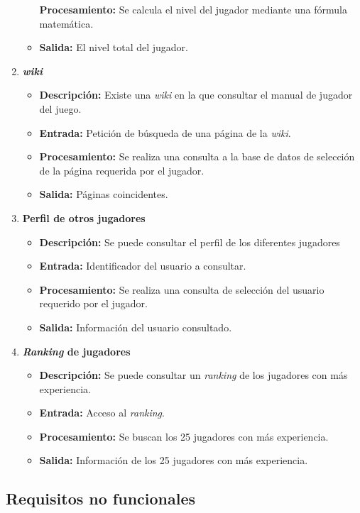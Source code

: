 \begin{enumerate}[label=\textbf{RF-\arabic*}]
\begin{itemize}
				\textbf{Procesamiento:}
				Se calcula el nivel del jugador mediante una fórmula matemática.
			\item
				\textbf{Salida:}
				El nivel total del jugador.
		\end{itemize}
	\item
		\textbf{\textit{wiki}}
		\begin{itemize}
			\item
				\textbf{Descripción:}
				Existe una \textit{wiki} en la que consultar el manual de jugador del juego.
			\item
				\textbf{Entrada:}
				Petición de búsqueda de una página de la \textit{wiki}.
			\item
				\textbf{Procesamiento:}
				Se realiza una consulta a la base de datos de selección de la página requerida por el jugador.
			\item
				\textbf{Salida:}
				Páginas coincidentes.
		\end{itemize}
	\item
		\textbf{Perfil de otros jugadores}
		\begin{itemize}
			\item
				\textbf{Descripción:}
				Se puede consultar el perfil de los diferentes jugadores
			\item
				\textbf{Entrada:}
				Identificador del usuario a consultar.
			\item
				\textbf{Procesamiento:}
				Se realiza una consulta de selección del usuario requerido por el jugador.
			\item
				\textbf{Salida:}
				Información del usuario consultado.
		\end{itemize}
	\item
		\textbf{\textit{Ranking} de jugadores}
		\begin{itemize}
			\item
				\textbf{Descripción:}
				Se puede consultar un \textit{ranking} de los jugadores con más experiencia.
			\item
				\textbf{Entrada:}
				Acceso al \textit{ranking}.
			\item
				\textbf{Procesamiento:}
				Se buscan los 25 jugadores con más experiencia.
			\item
				\textbf{Salida:}
				Información de los 25 jugadores con más experiencia.
		\end{itemize}
\end{enumerate}

\subsection{Requisitos no funcionales}

